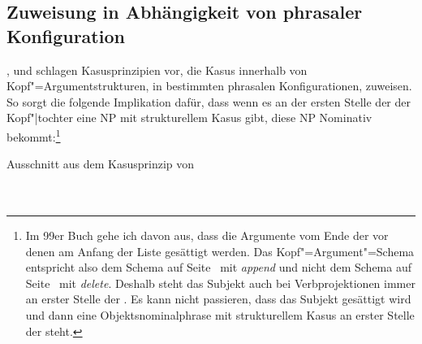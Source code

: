 \subsection{Zuweisung in Abhängigkeit von phrasaler Konfiguration}

\mbox{},  und 
schlagen Kasusprinzipien vor, die Kasus innerhalb von Kopf"=Argumentstrukturen, \dash in bestimmten
phrasalen Konfigurationen, zuweisen. So sorgt \zb die folgende Implikation dafür,
dass wenn es an der ersten Stelle der \subcatl der Kopf"|tochter eine NP mit strukturellem
Kasus gibt, diese NP Nominativ bekommt:\footnote{
  Im 99er Buch gehe ich davon aus, dass die Argumente vom Ende der \subcatl vor denen am Anfang der
  Liste gesättigt werden. Das Kopf"=Argument"=Schema entspricht also dem Schema auf
  Seite~\pageref{schema-bin-prel} mit \emph{append}   und nicht dem Schema auf
  Seite~\pageref{schema-bin-prel2} mit \emph{delete}. Deshalb steht das Subjekt auch bei
  Verbprojektionen immer an erster Stelle der \subcatl. Es kann nicht passieren, dass das Subjekt
  gesättigt wird und dann eine Objektsnominalphrase mit strukturellem Kasus an erster Stelle der \subcatl steht.%
}

\eas
Ausschnitt aus dem Kasusprinzip von \\
 ~\impl \\ \\
\mbox{}\hspace{3cm}
\zs

